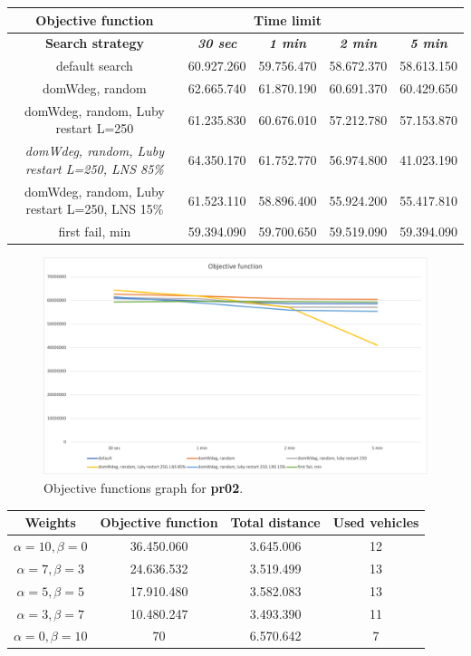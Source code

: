 {
\renewcommand{\arraystretch}{2}
\begin{longtable}[h]{| c | c | c | c | c |}
    \hline
    \textbf{Objective function} & \multicolumn{3}{c}{Time limit} & \\
    \hline
    \textbf{Search strategy} & \textbf{\textit{30 sec}} & \textbf{\textit{1 min}} & \textbf{\textit{2 min}} & \textbf{\textit{5 min}} \\
    \hline
    \endhead
    default search                                         & 60.927.260 & 59.756.470 & 58.672.370 & 58.613.150 \\
    \hline
    domWdeg, random                                        & 62.665.740 & 61.870.190 & 60.691.370 & 60.429.650 \\
    \hline
    domWdeg, random, Luby restart L=250                    & 61.235.830 & 60.676.010 & 57.212.780 & 57.153.870 \\
    \hline
    \textit{domWdeg, random, Luby restart L=250, LNS 85\%} & 64.350.170 & 61.752.770 & 56.974.800 & 41.023.190 \\
    \hline
    domWdeg, random, Luby restart L=250, LNS 15\%          & 61.523.110 & 58.896.400 & 55.924.200 & 55.417.810 \\
    \hline
    first fail, min                                        & 59.394.090 & 59.700.650 & 59.519.090 & 59.394.090 \\
    \hline
\end{longtable}
}
\begin{figure}[H]
    \centering
    \includegraphics[width=0.8\columnwidth]{../graphs/pr02-objf.png}
    \caption{Objective functions graph for \textbf{pr02}.}
\end{figure}
{
\renewcommand{\arraystretch}{2}
\begin{longtable}[h]{| c | c | c | c |}
    \hline
    \textbf{Weights} & \textbf{Objective function} & \textbf{Total distance} & \textbf{Used vehicles} \\
    \hline
    \endhead
    $\alpha = 10, \beta = 0$ & 36.450.060 & 3.645.006 & 12 \\
    \hline
    $\alpha = 7, \beta = 3$  & 24.636.532 & 3.519.499 & 13 \\
    \hline
    $\alpha = 5, \beta = 5$  & 17.910.480 & 3.582.083 & 13 \\
    \hline
    $\alpha = 3, \beta = 7$  & 10.480.247 & 3.493.390 & 11 \\
    \hline
    $\alpha = 0, \beta = 10$ &         70 & 6.570.642 &  7 \\
    \hline
\end{longtable}
}
